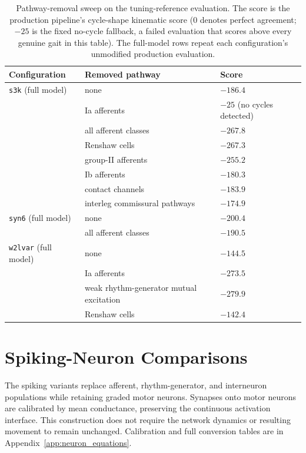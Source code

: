\begin{table}[htbp]
\caption{Pathway-removal sweep on the tuning-reference evaluation. The score is the production pipeline's cycle-shape kinematic score (0 denotes perfect agreement; $-25$ is the fixed no-cycle fallback, a failed evaluation that scores above every genuine gait in this table). The full-model rows repeat each configuration's unmodified production evaluation.}
\label{tab:walker_ablations}
\small\begin{tabularx}{\textwidth}{@{}>{\raggedright\arraybackslash}p{}>{\raggedright\arraybackslash}X>{\raggedright\arraybackslash}p{}@{}}
\toprule
\textbf{Configuration} & \textbf{Removed pathway} & \textbf{Score} \\
\midrule
\texttt{s3k} (full model) & none & $-186.4$ \\
 & Ia afferents & $-25$ (no cycles detected) \\
 & all afferent classes & $-267.8$ \\
 & Renshaw cells & $-267.3$ \\
 & group-II afferents & $-255.2$ \\
 & Ib afferents & $-180.3$ \\
 & contact channels & $-183.9$ \\
 & interleg commissural pathways & $-174.9$ \\
\addlinespace
\texttt{syn6} (full model) & none & $-200.4$ \\
 & all afferent classes & $-190.5$ \\
\addlinespace
\texttt{w2lvar} (full model) & none & $-144.5$ \\
 & Ia afferents & $-273.5$ \\
 & weak rhythm-generator mutual excitation & $-279.9$ \\
 & Renshaw cells & $-142.4$ \\
\bottomrule
\end{tabularx}
\end{table}

\section{Spiking-Neuron Comparisons}\label{sec:spiking_methods}\label{sec:spiking_results}\label{sec:disc_spiking}

The spiking variants replace afferent, rhythm-generator, and interneuron populations while retaining graded motor neurons. Synapses onto motor neurons are calibrated by mean conductance, preserving the continuous activation interface. This construction does not require the network dynamics or resulting movement to remain unchanged. Calibration and full conversion tables are in Appendix~\ref{app:neuron_equations}.

